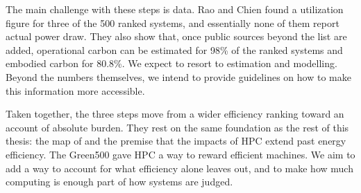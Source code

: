 The main challenge with these steps is data. Rao and Chien \parencite{rao2025Modeling} found a utilization figure for three of the 500 ranked systems, and essentially none of them report actual power draw. They also show that, once public sources beyond the list are added, operational carbon can be estimated for 98\% of the ranked systems and embodied carbon for 80.8\%. We expect to resort to estimation and modelling. Beyond the numbers themselves, we intend to provide guidelines on how to make this information more accessible.

Taken together, the three steps move from a wider efficiency ranking toward an account of absolute burden. They rest on the same foundation as the rest of this thesis: the map of  and the premise that the impacts of HPC extend past energy efficiency. The Green500 gave HPC a way to reward efficient machines. We aim to add a way to account for what efficiency alone leaves out, and to make how much computing is enough part of how systems are judged.
